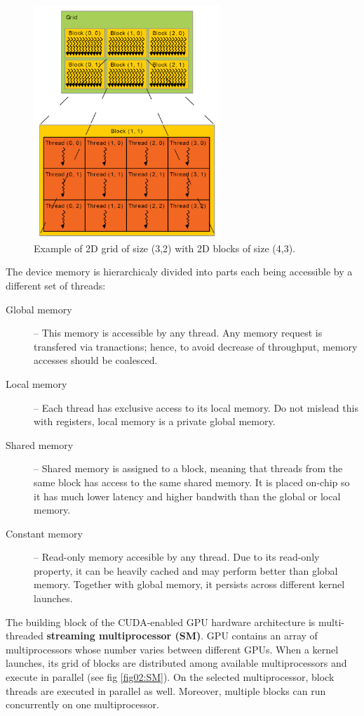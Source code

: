 \begin{figure}\centering
	\includegraphics[width=7cm]{img/grid}
	\caption{Example of 2D grid of size (3,2) with 2D blocks of size (4,3).}
	\label{fig02:grid}
\end{figure}


The device memory is hierarchicaly divided into parts each being accessible by a different set of threads:

\begin{description}
	\item[Global memory] -- This memory is accessible by any thread. Any memory request is transfered via tranactions; hence, to avoid decrease of throughput, memory accesses should be coalesced. 
	\item[Local memory] -- Each thread has exclusive access to its local memory. Do not mislead this with registers, local memory is a private global memory.
	\item[Shared memory] -- Shared memory is assigned to a block, meaning that threads from the same block has access to the same shared memory. It is placed on-chip so it has much lower latency and higher bandwith than the global or local memory.
	\item[Constant memory] -- Read-only memory accesible by any thread. Due to its read-only property, it can be heavily cached and may perform better than global memory. Together with global memory, it persists across different kernel launches.
\end{description}

The building block of the CUDA-enabled GPU hardware architecture is multi-threaded \textbf{streaming multiprocessor (SM)}. GPU contains an array of multiprocessors whose number varies between different GPUs. When a kernel launches, its grid of blocks are distributed among available multiprocessors and execute in parallel (see fig \ref{fig02:SM}). On the selected multiprocessor, block threads are executed in parallel as well. Moreover, multiple blocks can run concurrently on one multiprocessor.

